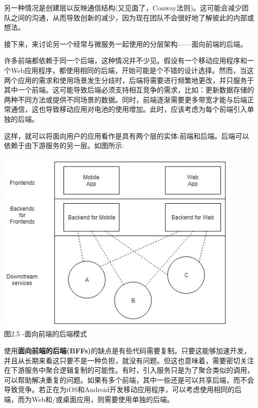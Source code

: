 另一种情况是创建层以反映通信结构(又见面了，Conway法则)。这可能会减少团队之间的沟通，从而导致创新的减少，因为现在团队不会很好地了解彼此的内部或想法。

接下来，来讨论另一个经常与微服务一起使用的分层架构——面向前端的后端。


许多前端都依赖于同一个后端，这种情况并不少见。假设有一个移动应用程序和一个Web应用程序，都使用相同的后端，开始可能是个不错的设计选择。然而，当这两个应用的需求和使用场景发生分歧时，后端将需要进行频繁地更改，并只服务于其中一个前端。这可能导致后端必须支持相互竞争的需求，比如：更新数据存储的两种不同方法或提供不同场景的数据。同时，前端逐渐需要更多带宽才能与后端正常通信，这也导致移动应用对电池的使用增加。此时，应该考虑为每个前端引入单独的后端。

这样，就可以将面向用户的应用看作是具有两个层的实体:前端和后端。后端可以依赖于由下游服务的另一层。如图所示:

\begin{center}
\includegraphics[width=0.9\textwidth]{content/1/chapter2/images/5.jpg}\\
图2.5 -面向前端的后端模式
\end{center}

使用\textbf{面向前端的后端(BFFs)}的缺点是有些代码需要复制。只要这能够加速开发，并且从长期来看这只要不是一种负担，就没有问题。但这也意味着，需要密切关注在下游服务中聚合逻辑复制的可能性。有时，引入服务只是为了聚合类似的调用，可以帮助解决重复的问题。如果有多个前端，其中一些还是可以共享后端，而不会导致竞争。若正在为iOS和Android开发移动应用程序，可以考虑使用相同的后端，而为Web和/或桌面应用，则需要使用单独的后端。






















